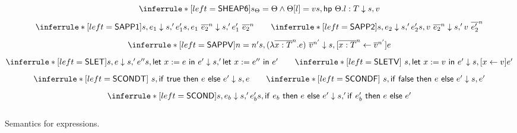 \begin{figure}[H]
\[\begin{array}{@{}c@{}}
              \inferrule*[left=\kw{SHEAP6}]{s_\Theta = \Theta  \wedge \kheap[l] = v}{\eval s {\hpe \kheap {\addr l T}} s v}\\[2ex]

       
       \inferrule*[left=\kw{SAPP1}]{\eval s {e_1} s' {e_1'}}{\eval s {\app {e_1} {e_2} n} s' {\app {e_1'} {e_2} n}} \ \ \ \ \ \ 
       \inferrule*[left=\kw{SAPP2}]{\eval s {e_2} s' {e_2'}}{\eval s {\app {v} {e_2} {n}} s' {\app {v} {e_2'} {n}}}\\[2ex]
       \inferrule*[left=\kw{SAPPV}]{n = n'}
       {\eval s {\app {(\abs x T n {e})} {v} {n'}} s [\overline{x : T}^n \leftarrow {\overline{v}^{n'}}]e}\\[2ex]
       
       \inferrule*[left=\kw{SLET}]{\eval s {e} s' {e''}}{\eval s {\elet x e {e'}} s' {\elet x {e''} {e'}}}\ \ \ \ \ \
       \inferrule*[left=\kw{SLETV}]{~}{\eval s {\elet x v {e'}} s {[x \leftarrow v]e'}}\\[2ex]
       
       \inferrule*[left=\kw{SCONDT}]{~}{\eval s {\cond {\kw{true}} e {e'}} s {e}}\ \ \ \ \ \
       \inferrule*[left=\kw{SCONDF}]{~}{\eval s {\cond {\kw{false}} e {e'}} s {e'}}\\[2ex]
       
       \inferrule*[left=\kw{SCOND}]{\eval s {e_b} s' {e_b'}}{\eval s {\cond {e_b} e {e'}} s' {\cond {e_b'} e {e'}}}\\[2ex]

  \end{array}
 \]
 \caption{Semantics for expressions.}\label{fig:exp_sem}
\end{figure}
